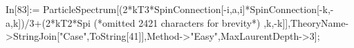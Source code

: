 In[83]:= ParticleSpectrum[(2*kT3*SpinConnection[-i,a,i]*SpinConnection[-k,-a,k])/3+(2*kT2*Spi (*omitted 2421 characters for brevity*) ,k,-k]],TheoryName->StringJoin["Case",ToString[41]],Method->"Easy",MaxLaurentDepth->3];